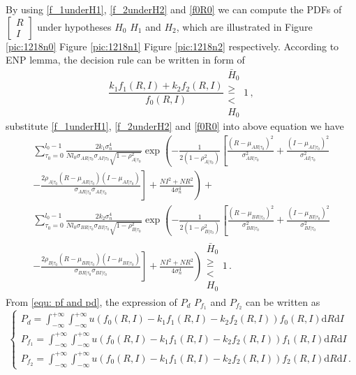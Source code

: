 By using \eqref{f_1underH1}, \eqref{f_2underH2} and \eqref{f0R0} we can compute the PDFs of  $\begin{bmatrix}
  R \\
  I
\end{bmatrix}$ under hypotheses $H_0$ $H_1$ and $H_2$, which are illustrated in Figure \ref{pic:1218n0} Figure \ref{pic:1218n1} Figure \ref{pic:1218n2} respectively. 
According to ENP lemma, the decision rule can be written in form of 
\begin{equation}
  \frac{k_1f_1(R,I)+k_2f_2(R,I)}{f_0(R,I)}\substack{\bar{H}_0 \\ \geq \\ < \\ H_0} 1\,,
\end{equation}
substitute \eqref{f_1underH1}, \eqref{f_2underH2} and \eqref{f0R0} into above equation we have 
\begin{equation}
\begin{split}
\sum_{\tau_0=0}^{l_0-1}\frac{2k_1\sigma_n^4}{Nl_0\sigma_{AR|\tau_0}\sigma_{AI|\tau_0}\sqrt{1-\rho_{A|\tau_0}^2}}\exp\left(-\frac{1}{2(1-\rho_{A|\tau_0}^2)}\left[ \frac{(R-\mu_{AR|\tau_0})^2}{\sigma_{AR|\tau_0}^2}+\frac{(I-\mu_{AI|\tau_0})^2}{\sigma_{AI|\tau_0}^2} \right. \right. \\
\left. \left.  - \frac{2\rho_{A|\tau_0}(R-\mu_{AR|\tau_0})(I-\mu_{AI|\tau_0})}{\sigma_{AR|\tau_0}\sigma_{AI|\tau_0}} \right] +\frac{NI^2+NR^2}{4\sigma_n^4}\right)
+\\
\sum_{\tau_0=0}^{l_0-1}\frac{2k_2\sigma_n^4}{Nl_0\sigma_{BR|\tau_0}\sigma_{BI|\tau_0}\sqrt{1-\rho_{B|\tau_0}^2}}\exp\left(
-\frac{1}{2(1-\rho_{B|\tau_0}^2)}\left[ \frac{(R-\mu_{BR|\tau_0})^2}{\sigma_{BR|\tau_0}^2}+\frac{(I-\mu_{BI|\tau_0})^2}{\sigma_{BI|\tau_0}^2} \right. \right. \\
\left. \left. - \frac{2\rho_{B|\tau_0}(R-\mu_{BR|\tau_0})(I-\mu_{BI|\tau_0})}{\sigma_{BR|\tau_0}\sigma_{BI|\tau_0}}  
\right] +\frac{NI^2+NR^2}{4\sigma_n^4}
\right) \substack{\bar{H}_0 \\ \geq \\ < \\ H_0}1\,.
\end{split}
\end{equation}
From \eqref{equ: pf and pd}, the expression of $P_d$ $P_{f_1}$ and $P_{f_2}$ can be written as
\begin{equation}
  \begin{cases}
    P_d = \int_{-\infty}^{+\infty}\int_{-\infty}^{+\infty} u(f_0(R,I) - k_1f_1(R,I) - k_2f_2(R,I))f_0(R,I)\mathrm{d}R\mathrm{d}I\\ 
	P_{f_1} = \int_{-\infty}^{+\infty}\int_{-\infty}^{+\infty} u(f_0(R,I) - k_1f_1(R,I) - k_2f_2(R,I))f_1(R,I)\mathrm{d}R\mathrm{d}I\\
	P_{f_2} = \int_{-\infty}^{+\infty}\int_{-\infty}^{+\infty} u(f_0(R,I) - k_1f_1(R,I) - k_2f_2(R,I))f_2(R,I)\mathrm{d}R\mathrm{d}I\,. 
  \end{cases}
  \label{asdffghj}
\end{equation}


